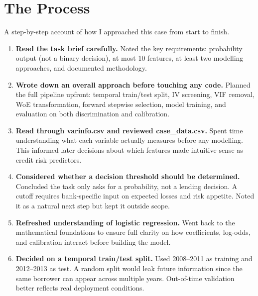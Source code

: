 \documentclass[a4paper,11pt]{article}
\begin{document}
\section{The Process}

A step-by-step account of how I approached this case from start to finish.

\begin{enumerate}[leftmargin=1.5em, label=\textbf{Step \arabic*.}]

  \item \textbf{Read the task brief carefully.}
        Noted the key requirements: probability output (not a binary decision),
        at most 10 features, at least two modelling approaches, and documented methodology.

  \item \textbf{Wrote down an overall approach before touching any code.}
        Planned the full pipeline upfront: temporal train/test split, IV screening,
        VIF removal, WoE transformation, forward stepwise selection, model training,
        and evaluation on both discrimination and calibration.

  \item \textbf{Read through varinfo.csv and reviewed case\_data.csv.}
        Spent time understanding what each variable actually measures before any
        modelling. This informed later decisions about which features made intuitive
        sense as credit risk predictors.

  \item \textbf{Considered whether a decision threshold should be determined.}
        Concluded the task only asks for a probability, not a lending decision.
        A cutoff requires bank-specific input on expected losses and risk appetite.
        Noted it as a natural next step but kept it outside scope.

  \item \textbf{Refreshed understanding of logistic regression.}
        Went back to the mathematical foundations to ensure full clarity on how
        coefficients, log-odds, and calibration interact before building the model.

  \item \textbf{Decided on a temporal train/test split.}
        Used 2008--2011 as training and 2012--2013 as test. A random split would
        leak future information since the same borrower can appear across multiple
        years. Out-of-time validation better reflects real deployment conditions.


\end{enumerate}
\end{document}
